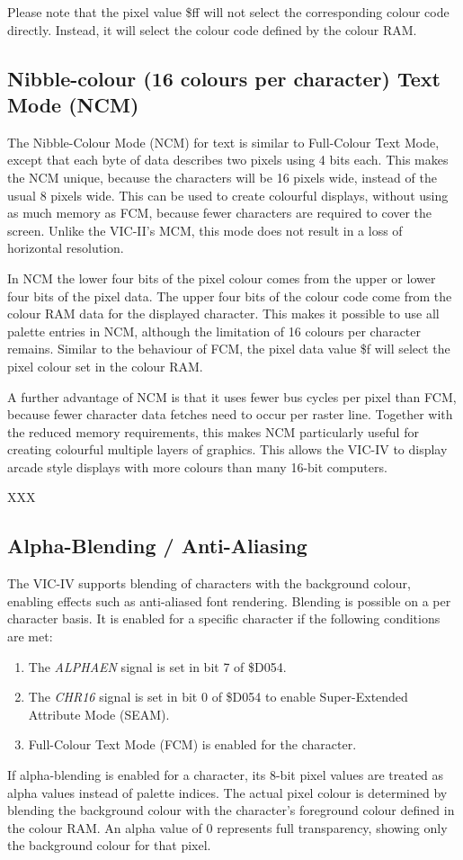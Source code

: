 Please note that the pixel value \$ff will not select the corresponding colour code directly. Instead, it will select the colour code defined by the colour RAM.

\subsection{Nibble-colour (16 colours per character) Text Mode (NCM)}

The Nibble-Colour Mode (NCM) for text is similar to Full-Colour Text Mode, except that each byte of data describes two
pixels using 4 bits each. This makes the NCM unique, because the characters will be 16 pixels wide, instead of the usual 8 pixels wide. This can be used to create colourful displays, without using as much memory as FCM, because fewer characters are required to cover the screen.  Unlike the VIC-II's MCM, this mode does not result in a loss of horizontal resolution.

In NCM the lower four bits of the pixel colour comes from the upper or lower four bits of the pixel data.  The upper four bits of the colour code come from the colour RAM data for the displayed character.  This makes it possible to use all palette entries in NCM, although the limitation of 16 colours per character remains. Similar to the behaviour of FCM, the pixel data value \$f will select the pixel colour set in the colour RAM.

A further advantage of NCM is that it uses fewer bus cycles per pixel than FCM, because fewer character data fetches need to occur per raster line.  Together with the reduced memory requirements, this makes NCM particularly useful for creating colourful multiple layers of graphics.  This allows the VIC-IV to display arcade style displays with more colours than many 16-bit computers.


XXX

\subsection{Alpha-Blending / Anti-Aliasing}

The VIC-IV supports blending of characters with the background colour, enabling effects such as anti-aliased font rendering. Blending is possible on a per character basis. It is enabled for a specific character if the following conditions are met:
\begin{enumerate}
  \item The {\em ALPHAEN} signal is set in bit 7 of \$D054.
  \item The {\em CHR16} signal is set in bit 0 of \$D054 to enable Super-Extended Attribute Mode (SEAM).
  \item Full-Colour Text Mode (FCM) is enabled for the character.
\end{enumerate}
If alpha-blending is enabled for a character, its 8-bit pixel values are treated as alpha values instead of palette indices. The actual pixel colour is determined by blending the background colour with the character's foreground colour defined in the colour RAM. An alpha value of 0 represents full transparency, showing only the background colour for that pixel.

